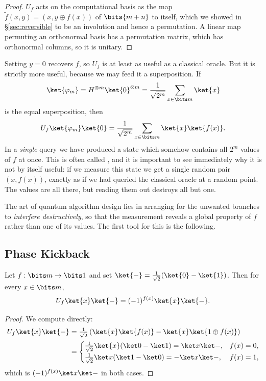 \begin{proof}
	$U_f$ acts on the computational basis as the map $\widetilde f(x,y) = (x, y\oplus f(x))$ of $\bits{m+n}$ to itself, which we showed in \S\ref{sec:reversible} to be an involution and hence a permutation. A linear map permuting an orthonormal basis has a permutation matrix, which has orthonormal columns, so it is unitary.
\end{proof}

Setting $y = 0$ recovers $f$, so $U_f$ is at least as useful as a classical oracle. But it is strictly more useful, because we may feed it a superposition. If
$$\ket{\varphi_m} = H^{\otimes m}\ket{0}^{\otimes m} = \frac{1}{\sqrt{2^m}}\sum_{x\in\bits m}\ket{x}$$
is the equal superposition, then
$$U_f\ket{\varphi_m}\ket{0} = \frac{1}{\sqrt{2^m}}\sum_{x\in\bits m}\ket{x}\ket{f(x)}.$$
In a \emph{single} query we have produced a state which somehow contains all $2^m$ values of $f$ at once. This is often called , and it is important to see immediately why it is not by itself useful: if we measure this state we get a single random pair $(x,f(x))$, exactly as if we had queried the classical oracle at a random point. The values are all there, but reading them out destroys all but one.

The art of quantum algorithm design lies in arranging for the unwanted branches to \emph{interfere destructively}, so that the measurement reveals a global property of $f$ rather than one of its values. The first tool for this is the following.

\subsection{Phase Kickback}\label{sec:kickback}

\begin{proposition}
	Let $f:\bits m\to\bits1$ and set $\ket{-} = \tfrac1{\sqrt2}(\ket{0}-\ket{1})$. Then for every $x \in \bits m$,
	$$U_f\ket{x}\ket{-} = (-1)^{f(x)}\ket{x}\ket{-}.$$
\end{proposition}

\begin{proof}
	We compute directly:
	\begin{align*}
		U_f\ket{x}\ket{-} &= \tfrac1{\sqrt2}\left(\ket{x}\ket{f(x)} - \ket{x}\ket{1\oplus f(x)}\right)\\
		&= \begin{cases}\tfrac1{\sqrt2}\ket{x}(\ket0-\ket1) = \ket x\ket-, & f(x)=0,\\[2pt] \tfrac1{\sqrt2}\ket x(\ket1-\ket0) = -\ket x\ket-, & f(x)=1,\end{cases}
	\end{align*}
	which is $(-1)^{f(x)}\ket x\ket-$ in both cases.
\end{proof}

